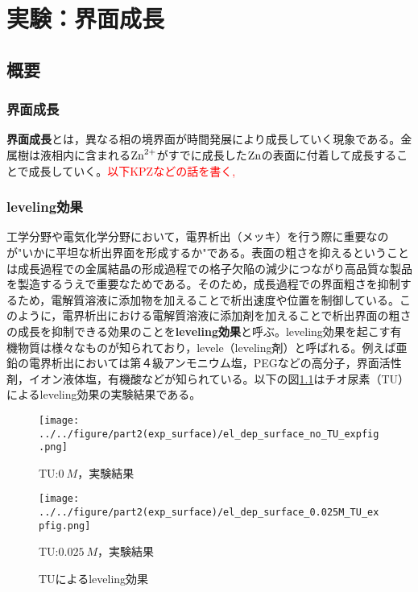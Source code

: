 \documentclass[autodetect-engine,dvi=dvipdfmx,a4paper,ja=standard,oneside,openany,11pt,draft]{bxjsbook}
\begin{document}
\chapter{実験：界面成長}
\section{概要}
\subsection{界面成長}
\textbf{界面成長}とは，異なる相の境界面が時間発展により成長していく現象である。金属樹は液相内に含まれる$\ce{Zn^{2+}}$がすでに成長した$\ce{Zn}$の表面に付着して成長することで成長していく。\textcolor{red}{以下KPZなどの話を書く\cite{wolf1990growth}\cite{schilardi1998evolution},\cite{kardar1987scaling}}
\subsection{leveling効果}
工学分野や電気化学分野において，電界析出（メッキ）を行う際に重要なのが"いかに平坦な析出界面を形成するか"である。表面の粗さを抑えるということは成長過程での金属結晶の形成過程での格子欠陥の減少につながり高品質な製品を製造するうえで重要なためである。そのため，成長過程での界面粗さを抑制するため，電解質溶液に添加物を加えることで析出速度や位置を制御している。このように，電界析出における電解質溶液に添加剤を加えることで析出界面の粗さの成長を抑制できる効果のことを\textbf{leveling効果}と呼ぶ。leveling効果を起こす有機物質は様々なものが知られており，levele（leveling剤）と呼ばれる。例えば亜鉛の電界析出においては第４級アンモニウム塩，PEGなどの高分子，界面活性剤，イオン液体塩，有機酸\cite{sorour2017review}などが知られている。以下の図\ref{fig:leveling}はチオ尿素（TU）によるleveling効果の実験結果である\cite{schilardi1998evolution}。
\begin{figure}[H]
  \begin{minipage}
    {0.5\textwidth}
    \centering
    \texttt{[image: ../../figure/part2(exp\_surface)/el\_dep\_surface\_no\_TU\_expfig.png]}
    \caption{TU:$\SI{0}{M}$，実験結果}
    \label{fig:no_leveling_effect}
  \end{minipage}
  \begin{minipage}
    {0.5\textwidth}
    \centering
    \texttt{[image: ../../figure/part2(exp\_surface)/el\_dep\_surface\_0.025M\_TU\_expfig.png]}
    \caption{TU:$\SI{0.025}{M}$，実験結果}
    \label{fig:leveling_effect}
  \end{minipage}
  \caption{TUによるleveling効果\cite{schilardi1998evolution}}
  \label{fig:leveling}
\end{figure}
\end{document}
